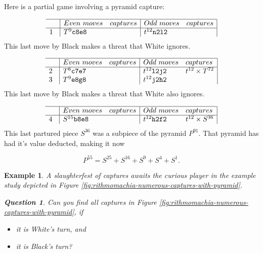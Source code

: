 \documentclass[12pt]{article}
\newtheorem{example}[theorem]{Example}
\newtheorem{question}{Question}
\begin{document}

Here is a partial game involving a pyramid capture:

\[
\begin{array}{l|ll|ll|} \hline
  \quad & Even\ moves & captures & Odd\ moves & captures \\ \hline
  1 & T^9{\tt c8e8} &  & t^{12}{\tt n2l2} &   \\
\end{array}
\]
This last move by Black makes a threat that White ignores.

\[
\begin{array}{l|ll|ll|} \hline
  \quad & Even\ moves & captures & Odd\ moves & captures \\ \hline  
  2 & T^6{\tt c7e7} &  & t^{12}{\tt l2j2} & t^{12}\times T^{72}  \\
  3 & T^9{\tt e8g8} &  & t^{12}{\tt j2h2} &   \\
\end{array}
\]
This last move by Black makes a threat that White also ignores.

\[
\begin{array}{l|ll|ll|} \hline
  \quad & Even\ moves & captures & Odd\ moves & captures \\ \hline  
  4 & S^{15}{\tt b8e8} &  & t^{12}{\tt h2f2} & t^{12}\times S^{36}  \\
\end{array}
\]
This last partured piece $S^{36}$ was a subpiece of the 
pyramid $P^{91}$. That pyramid has had it's value deducted, making it now

\[
P^{55} = S^{25}+S^{16}+S^9+S^4+S^1.
\]


\begin{example}
A slaughterfest of captures awaits the curious player
in the example study depicted in
Figure \ref{fig:rithmomachia-numerous-captures-with-pyramid}.

\begin{question}
Can you find all captures in
Figure \ref{fig:rithmomachia-numerous-captures-with-pyramid}, if
\begin{itemize}
\item[(a)]
  it is White's turn, and
\item[(b)]
  it is Black's turn?
\end{itemize}
\end{question}
\end{example}
\end{document}
